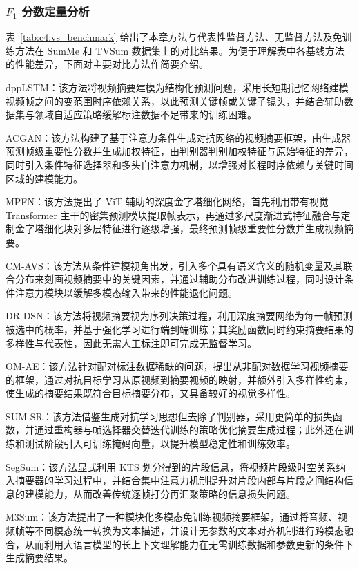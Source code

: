 \subsubsection{$F_1$ 分数定量分析}
表~\ref{tab:c4:vs_benchmark} 给出了本章方法与代表性监督方法、无监督方法及免训练方法在 SumMe 和 TVSum 数据集上的对比结果。为便于理解表中各基线方法的性能差异，下面对主要对比方法作简要介绍。

dppLSTM\cite{zhang2016video}：该方法将视频摘要建模为结构化预测问题，采用长短期记忆网络建模视频帧之间的变范围时序依赖关系，以此预测关键帧或关键子镜头，并结合辅助数据集与领域自适应策略缓解标注数据不足带来的训练困难。

ACGAN\cite{he2019unsupervised}：该方法构建了基于注意力条件生成对抗网络的视频摘要框架，由生成器预测帧级重要性分数并生成加权特征，由判别器判别加权特征与原始特征的差异，同时引入条件特征选择器和多头自注意力机制，以增强对长程时序依赖与关键时间区域的建模能力。

MPFN\cite{khan2024deep}：该方法提出了 ViT 辅助的深度金字塔细化网络，首先利用带有视觉 Transformer 主干的密集预测模块提取帧表示，再通过多尺度渐进式特征融合与定制金字塔细化块对多层特征进行逐级增强，最终预测帧级重要性分数并生成视频摘要。

CM-AVS\cite{huang2026conditional}：该方法从条件建模视角出发，引入多个具有语义含义的随机变量及其联合分布来刻画视频摘要中的关键因素，并通过辅助分布改进训练过程，同时设计条件注意力模块以缓解多模态输入带来的性能退化问题。

DR-DSN\cite{zhou2018deep}：该方法将视频摘要视为序列决策过程，利用深度摘要网络为每一帧预测被选中的概率，并基于强化学习进行端到端训练；其奖励函数同时约束摘要结果的多样性与代表性，因此无需人工标注即可完成无监督学习。

OM-AE\cite{rochan2019video}：该方法针对配对标注数据稀缺的问题，提出从非配对数据学习视频摘要的框架，通过对抗目标学习从原视频到摘要视频的映射，并额外引入多样性约束，使生成的摘要结果既符合目标摘要分布，又具备较好的视觉多样性。

SUM-SR\cite{li2024unsupervised}：该方法借鉴生成对抗学习思想但去除了判别器，采用更简单的损失函数，并通过重构器与帧选择器交替迭代训练的策略优化摘要生成过程；此外还在训练和测试阶段引入可训练掩码向量，以提升模型稳定性和训练效率。

SegSum\cite{bang2025integrate}：该方法显式利用 KTS 划分得到的片段信息，将视频片段级时空关系纳入摘要器的学习过程中，并结合集中注意力机制提升对片段内部与片段之间结构信息的建模能力，从而改善传统逐帧打分再汇聚策略的信息损失问题。

M3Sum\cite{wang2024m3sum}：该方法提出了一种模块化多模态免训练视频摘要框架，通过将音频、视频帧等不同模态统一转换为文本描述，并设计无参数的文本对齐机制进行跨模态融合，从而利用大语言模型的长上下文理解能力在无需训练数据和参数更新的条件下生成摘要结果。

